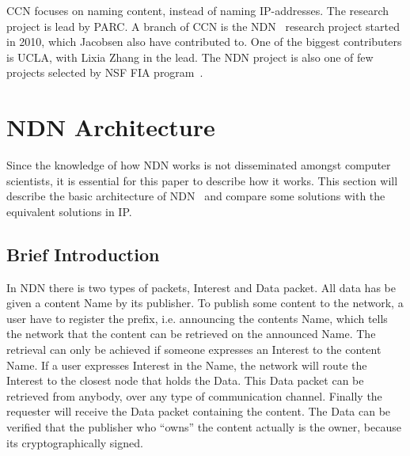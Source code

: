\gls{CCN} focuses on naming content, instead of naming \gls{IP}-addresses. 
The research project is lead by \gls{PARC}.
A branch of \gls{CCN} is the \gls{NDN}~\cite{DBLP:journals/ccr/0001ABJcCPWZ14} research project started in 2010, which Jacobsen also have contributed to.
One of the biggest contributers is \gls{UCLA}, with Lixia Zhang in the lead. 
The \gls{NDN} project is also one of few projects selected by \gls{NSF} \gls{FIA} program~\cite{nsf-fia}.

\section{NDN Architecture}\label{chp2:sec:ndn_architecture}
Since the knowledge of how \gls{NDN} works is not disseminated amongst computer scientists, it is essential for this paper to describe how it works.
This section will describe the basic architecture of \gls{NDN}~\cite{NDN-0021} and compare some solutions with the equivalent solutions in \gls{IP}.

\subsection{Brief Introduction}
In \gls{NDN} there is two types of packets, Interest and Data packet.
All data has be given a content Name by its publisher. 
To publish some content to the network, a user have to register the prefix, i.e. announcing the contents Name, which tells the network that the content can be retrieved on the announced Name. 
The retrieval can only be achieved if someone expresses an Interest to the content Name.
If a user expresses Interest in the Name, the network will route the Interest to the closest node that holds the Data. 
This Data packet can be retrieved from anybody, over any type of communication channel. 
Finally the requester will receive the Data packet containing the content.
The Data can be verified that the publisher who ``owns'' the content actually is the owner, because its cryptographically signed.

